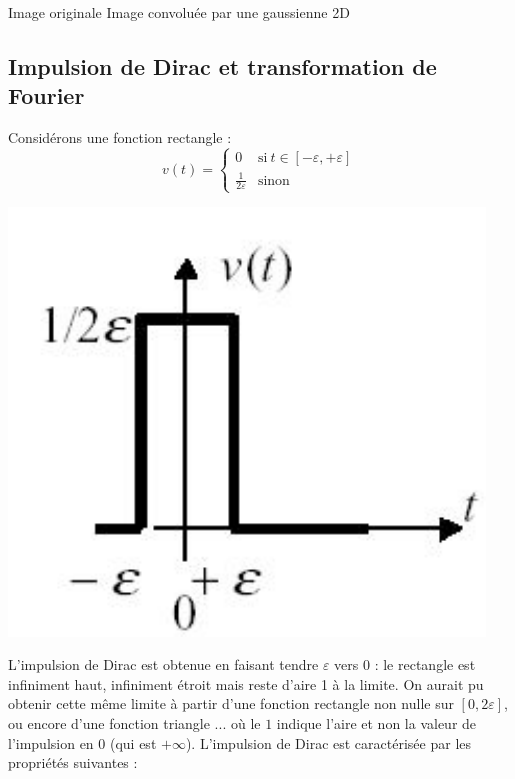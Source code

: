 \begin{example}
\begin{center}
Image originale \hspace*{2cm} Image convoluée par une gaussienne 2D \\
\end{center}
\end{example}

\subsection{Impulsion de Dirac et transformation de Fourier}

\begin{definition}

Considérons une fonction rectangle : 
\begin{equation}
    v(t)=
\begin{cases}
  0   & \text{si}~t \in [-\varepsilon,+\varepsilon] \\
  \frac{1}{2\varepsilon} & \text{sinon}
\end{cases}
\end{equation}
\begin{center}
\includegraphics[scale=0.38]{dirac1.pdf} 
\end{center}

L'impulsion de Dirac est obtenue en faisant tendre $\varepsilon$ vers 0 : le rectangle est infiniment haut, infiniment étroit mais reste d'aire 1 à la limite. On aurait pu obtenir cette même limite à partir d'une fonction rectangle non nulle sur $[0,2\varepsilon]$, ou encore d'une fonction { triangle }...
où le $1$ indique l'aire et non la valeur de l'impulsion en 0 (qui est $+\infty$).
L'impulsion de Dirac est caractérisée par les propriétés suivantes :


\end{definition}
